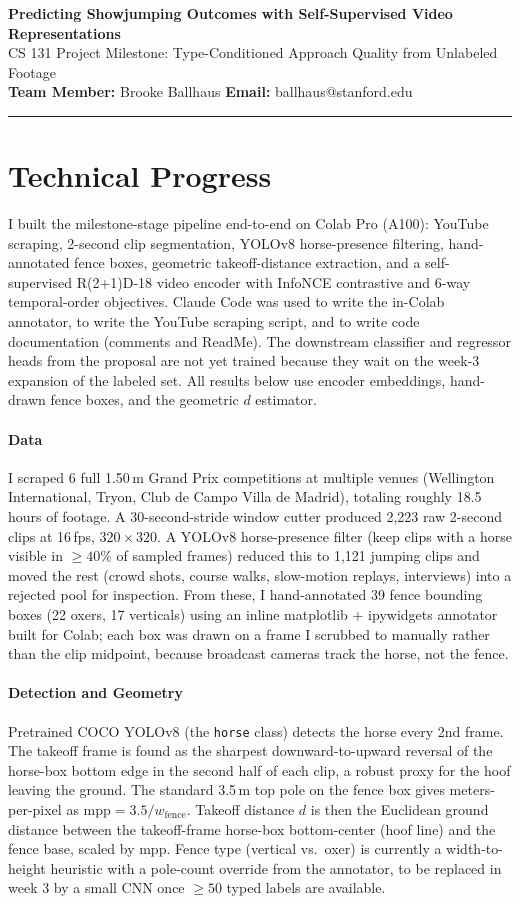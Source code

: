 \documentclass[11pt]{article}
\makeatletter
\renewcommand{\maketitle}{
  \begin{center}
    {\bf \LARGE {Predicting Showjumping Outcomes with Self-Supervised Video Representations}}\\
    \vspace{0.08cm}
    {\large CS 131 Project Milestone: Type-Conditioned Approach Quality from Unlabeled Footage}\\
    \vspace{0.08cm}
    {\bf Team Member:} Brooke Ballhaus \quad
    {\bf Email:} ballhaus@stanford.edu
  \end{center}
}
\makeatother
\begin{document}
\maketitle

\vspace{4pt}
\hrule
\vspace{8pt}

\section{Technical Progress}

I built the milestone-stage pipeline end-to-end on Colab Pro (A100): YouTube scraping, 2-second clip segmentation, YOLOv8 horse-presence filtering, hand-annotated fence boxes, geometric takeoff-distance extraction, and a self-supervised R(2+1)D-18 video encoder with InfoNCE contrastive and 6-way temporal-order objectives. Claude Code was used to write the in-Colab annotator, to write the YouTube scraping script, and to write code documentation (comments and ReadMe). The downstream classifier and regressor heads from the proposal are not yet trained because they wait on the week-3 expansion of the labeled set. All results below use encoder embeddings, hand-drawn fence boxes, and the geometric $d$ estimator.

\paragraph{Data} I scraped 6 full 1.50\,m Grand Prix competitions at multiple venues (Wellington International, Tryon, Club de Campo Villa de Madrid), totaling roughly 18.5 hours of footage. A 30-second-stride window cutter produced 2,223 raw 2-second clips at 16\,fps, $320\times320$. A YOLOv8 horse-presence filter (keep clips with a horse visible in $\geq40\%$ of sampled frames) reduced this to 1,121 jumping clips and moved the rest (crowd shots, course walks, slow-motion replays, interviews) into a rejected pool for inspection. From these, I hand-annotated 39 fence bounding boxes (22 oxers, 17 verticals) using an inline matplotlib + ipywidgets annotator built for Colab; each box was drawn on a frame I scrubbed to manually rather than the clip midpoint, because broadcast cameras track the horse, not the fence.

\paragraph{Detection and Geometry} Pretrained COCO YOLOv8 (the \texttt{horse} class) detects the horse every 2nd frame. The takeoff frame is found as the sharpest downward-to-upward reversal of the horse-box bottom edge in the second half of each clip, a robust proxy for the hoof leaving the ground. The standard 3.5\,m top pole on the fence box gives meters-per-pixel as $\mathrm{mpp} = 3.5/w_{\mathrm{fence}}$. Takeoff distance $d$ is then the Euclidean ground distance between the takeoff-frame horse-box bottom-center (hoof line) and the fence base, scaled by mpp. Fence type (vertical vs.\ oxer) is currently a width-to-height heuristic with a pole-count override from the annotator, to be replaced in week 3 by a small CNN once $\geq 50$ typed labels are available.
\end{document}
